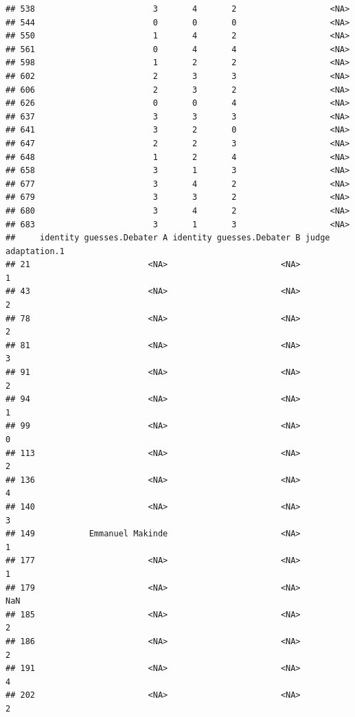 \documentclass[
]{article}
\begin{document}
\begin{verbatim}
## 538                        3       4       2                   <NA>
## 544                        0       0       0                   <NA>
## 550                        1       4       2                   <NA>
## 561                        0       4       4                   <NA>
## 598                        1       2       2                   <NA>
## 602                        2       3       3                   <NA>
## 606                        2       3       2                   <NA>
## 626                        0       0       4                   <NA>
## 637                        3       3       3                   <NA>
## 641                        3       2       0                   <NA>
## 647                        2       2       3                   <NA>
## 648                        1       2       4                   <NA>
## 658                        3       1       3                   <NA>
## 677                        3       4       2                   <NA>
## 679                        3       3       2                   <NA>
## 680                        3       4       2                   <NA>
## 683                        3       1       3                   <NA>
##     identity guesses.Debater A identity guesses.Debater B judge adaptation.1
## 21                        <NA>                       <NA>                  1
## 43                        <NA>                       <NA>                  2
## 78                        <NA>                       <NA>                  2
## 81                        <NA>                       <NA>                  3
## 91                        <NA>                       <NA>                  2
## 94                        <NA>                       <NA>                  1
## 99                        <NA>                       <NA>                  0
## 113                       <NA>                       <NA>                  2
## 136                       <NA>                       <NA>                  4
## 140                       <NA>                       <NA>                  3
## 149           Emmanuel Makinde                       <NA>                  1
## 177                       <NA>                       <NA>                  1
## 179                       <NA>                       <NA>                NaN
## 185                       <NA>                       <NA>                  2
## 186                       <NA>                       <NA>                  2
## 191                       <NA>                       <NA>                  4
## 202                       <NA>                       <NA>                  2

\end{verbatim}
\end{document}
